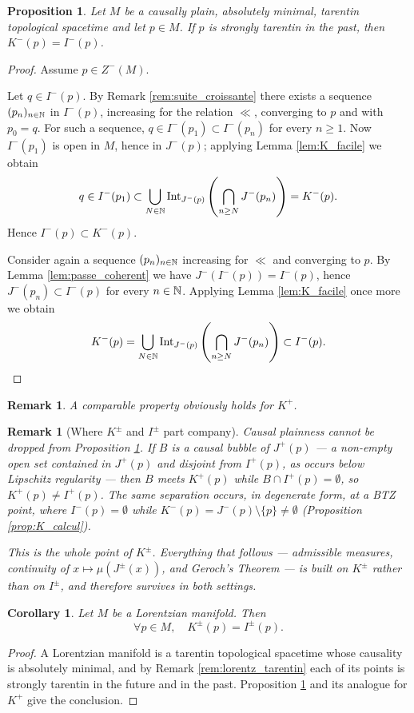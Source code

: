 \documentclass[a4paper,twoside]{article}
\newtheorem{cor}[lem]{Corollary}
\newtheorem{prop}[lem]{Proposition}
\newtheorem{rem}[lem]{Remark}
\begin{document}
\begin{prop}\label{prop:tarentin_fort_K}
Let $M$ be a causally plain, absolutely minimal, tarentin topological spacetime and let $p\in M$.
If $p$ is strongly tarentin in the past, then $K^-(p) = I^-(p)$.
\end{prop}
\begin{proof}
Assume $p\in Z^-(M)$.

Let $q\in I^-(p)$. By Remark \ref{rem:suite_croissante} there exists a sequence $(p_n)_{n\in \mathbb{N}}$ in $I^-(p)$, increasing for the relation $\ll$,
converging to $p$ and with $p_0=q$. For such a sequence, $q\in I^-(p_1)\subset I^-(p_n)$ for every $n\geq 1$. Now
$I^-(p_1)$ is open in $M$, hence in $J^-(p)$; applying Lemma \ref{lem:K_facile} we obtain
$$ q\in I^-(p_1)\subset \bigcup_{N\in \mathbb{N}} \mathrm{Int}_{J^-(p)}\left(\bigcap_{n\geq N} J^-(p_n)\right)=K^-(p). $$
Hence $I^-(p)\subset K^-(p)$.

Consider again a sequence $(p_n)_{n\in \mathbb{N}}$ increasing for $\ll$ and converging to $p$.
By Lemma \ref{lem:passe_coherent} we have $J^-(I^-(p))=I^-(p)$, hence $J^-(p_n) \subset I^-(p)$ for every $n\in \mathbb{N}$.
Applying Lemma \ref{lem:K_facile} once more we obtain
$$K^-(p) = \bigcup_{N\in \mathbb{N}} \mathrm{Int}_{J^-(p)}\left(\bigcap_{n\geq N} J^-(p_n)\right) \subset I^-(p). $$
\end{proof}
\begin{rem}
A comparable property obviously holds for $K^+$.
\end{rem}
\begin{rem}[Where $K^\pm$ and $I^\pm$ part company]\label{rem:K_neq_I}
Causal plainness cannot be dropped from Proposition \ref{prop:tarentin_fort_K}. If $B$ is a causal
bubble of $J^+(p)$ --- a non-empty open set contained in $J^+(p)$ and disjoint from $I^+(p)$, as
occurs below Lipschitz regularity \cite{MR2949547,MR3500220,samann2024nonregular} --- then $B$ meets
$K^+(p)$ while $B\cap I^+(p)=\emptyset$, so $K^+(p)\neq I^+(p)$. The same separation occurs, in
degenerate form, at a BTZ point, where $I^-(p)=\emptyset$ while
$K^-(p)=J^-(p)\setminus\{p\}\neq \emptyset$ (Proposition \ref{prop:K_calcul}).

This is the whole point of $K^\pm$. Everything that follows --- admissible measures, continuity of
$x\mapsto \mu(J^\pm(x))$, and Geroch's Theorem --- is built on $K^\pm$ rather than on $I^\pm$, and
therefore survives in both settings.
\end{rem}

\begin{cor}\label{cor:K_lorentzien} Let $M$ be a Lorentzian manifold. Then
$$\forall p\in M, \quad K^\pm(p)=I^\pm(p).$$
\end{cor}
\begin{proof}
A Lorentzian manifold is a tarentin topological spacetime whose causality is absolutely minimal,
and by Remark \ref{rem:lorentz_tarentin} each of its points is strongly tarentin in the future and
in the past. Proposition \ref{prop:tarentin_fort_K} and its analogue for $K^+$ give the conclusion.
\end{proof}
\end{document}
